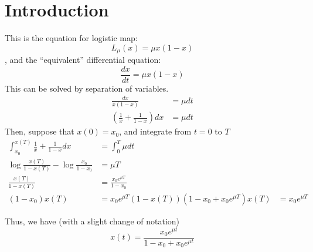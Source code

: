 \documentclass[11pt]{article}
\begin{document}
\section{Introduction}
This is the equation for logistic map:
\begin{equation}
  L_{\mu}(x) = \mu x(1-x)
  \label{logistic}
\end{equation}
, and the ``equivalent'' differential equation:
\begin{equation}
  \frac{dx}{dt} = \mu x(1-x)
  \label{logisticdiffeq}
\end{equation}
This can be solved by separation of variables.
\begin{align*}
  \frac{dx}{x(1-x)} &= \mu dt \\  
  \left( \frac{1}{x} + \frac{1}{1-x} \right) dx &= \mu dt
\end{align*}
Then, suppose that $x(0) = x_0$, and integrate from $t = 0$ to $T$
\begin{align*}
  \int_{x_0}^{x(T)} \frac{1}{x} + \frac{1}{1-x} dx &= \int_0^T \mu dt \\
  \log{\frac{x(T)}{1-x(T)}} - \log{\frac{x_0}{1-x_0}} &= \mu T \\
  \frac{x(T)}{1-x(T)} &= \frac{x_0 e^{\mu T}}{1-x_0} \\
  (1-x_0)x(T) &= x_0 e^{\mu T} (1-x(T))
  (1-x_0 + x_0 e^{\mu T})x(T) &= x_0 e^{\mu T}
\end{align*}

Thus, we have (with a slight change of notation)
\begin{equation}
  x(t) = \frac{x_0 e^{\mu t}}{1 - x_0 + x_0 e^{\mu t}}
  \label{logisticdiffeqsoln}
\end{equation}
\end{document}
